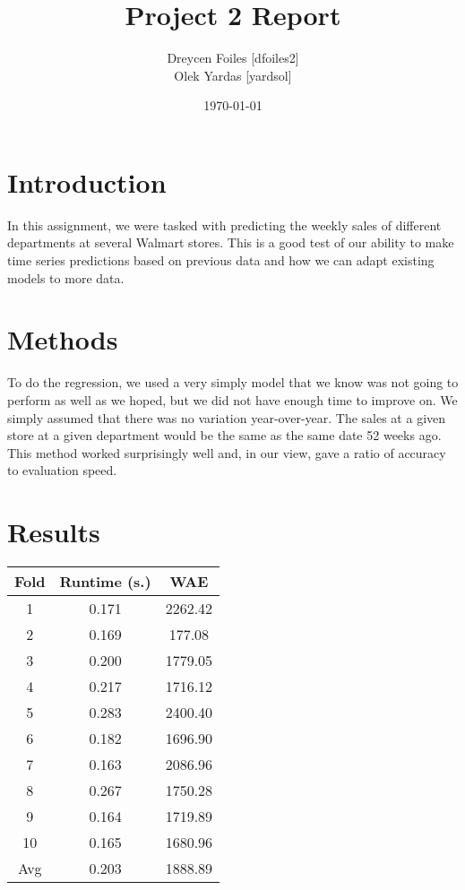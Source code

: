 \documentclass{article}
\title{Project 2 Report}
\author{Dreycen Foiles [dfoiles2] \\ Olek Yardas [yardsol]}
\date{\today}
\begin{document}
\maketitle

\section{Introduction}
In this assignment, we were tasked with predicting the weekly sales of different departments at several Walmart stores. This is a good test of our ability to make time series predictions based on previous data and how we can adapt existing models to more data. 

\section{Methods}
To do the regression, we used a very simply model that we know was not going to perform as well as we hoped, but we did not have enough time to improve on. We simply assumed that there was no variation year-over-year. The sales at a given store at a given department would be the same as the same date 52 weeks ago. This method worked surprisingly well and, in our view, gave a ratio of accuracy to evaluation speed. 

\section{Results}

\begin{center}
    \begin{tabular}{|c|c|c|}
        \hline
        Fold & Runtime (s.) & WAE \\ 
        \hline \hline 
        1 & 0.171 & 2262.42 \\ 
        \hline
        2 & 0.169 & 177.08 \\ 
        \hline
        3 & 0.200 & 1779.05 \\ 
        \hline
        4 & 0.217 & 1716.12 \\ 
        \hline
        5 & 0.283 & 2400.40 \\ 
        \hline
        6 & 0.182 & 1696.90 \\ 
        \hline
        7 & 0.163 & 2086.96 \\ 
        \hline
        8 & 0.267 & 1750.28 \\ 
        \hline
        9 & 0.164 & 1719.89 \\ 
        \hline
        10 & 0.165 & 1680.96 \\ 
        \hline
        Avg & 0.203 & 1888.89 \\ 
        \hline 
    \end{tabular}
\end{center}
\end{document}
